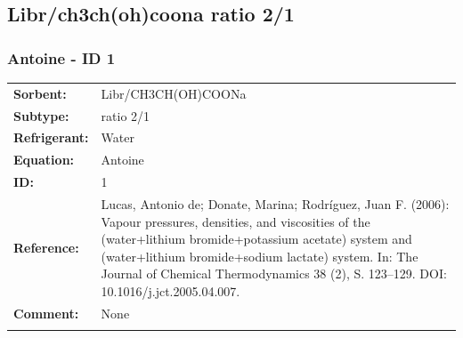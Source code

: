 \subsection{Libr/ch3ch(oh)coona ratio 2/1}
%
\subsubsection{Antoine - ID 1}
%
\begin{tabular}[l]{|lp{11.5cm}|}
\hline
\addlinespace

\textbf{Sorbent:} & Libr/CH3CH(OH)COONa \\
\textbf{Subtype:} & ratio 2/1 \\
\textbf{Refrigerant:} & Water \\
\textbf{Equation:} & Antoine \\
\textbf{ID:} & 1 \\
\textbf{Reference:} & Lucas, Antonio de; Donate, Marina; Rodríguez, Juan F. (2006): Vapour pressures, densities, and viscosities of the (water+lithium bromide+potassium acetate) system and (water+lithium bromide+sodium lactate) system. In: The Journal of Chemical Thermodynamics 38 (2), S. 123–129. DOI: 10.1016/j.jct.2005.04.007. \\
\textbf{Comment:} & None \\

\addlinespace
\hline
\end{tabular}
\newline

